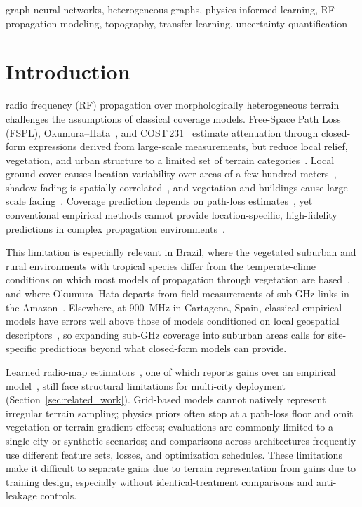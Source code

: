 \documentclass{ieeeaccess}
\begin{document}
\begin{keywords}
graph neural networks, heterogeneous graphs, physics-informed learning, RF propagation modeling, topography, transfer learning, uncertainty quantification
\end{keywords}

\titlepgskip=-15pt

\maketitle

\section{Introduction}
\label{sec:introduction}

 radio frequency (RF) propagation over morphologically heterogeneous terrain challenges the assumptions of classical coverage models. Free-Space Path Loss (FSPL), Okumura--Hata~\cite{hata1980empirical}, and COST\,231~\cite{cost231} estimate attenuation through closed-form expressions derived from large-scale measurements, but reduce local relief, vegetation, and urban structure to a limited set of terrain categories~\cite{vasudevan2024machine}. Local ground cover causes location variability over areas of a few hundred meters~\cite{itu1546}, shadow fading is spatially correlated~\cite{tr38901}, and vegetation and buildings cause large-scale fading~\cite{thrane2020model}. Coverage prediction depends on path-loss estimates~\cite{vasudevan2024machine}, yet conventional empirical methods cannot provide location-specific, high-fidelity predictions in complex propagation environments~\cite{yapar2024overview}.

This limitation is especially relevant in Brazil, where the vegetated suburban and rural environments with tropical species differ from the temperate-clime conditions on which most models of propagation through vegetation are based~\cite{silva2018propagation}, and where Okumura--Hata departs from field measurements of sub-GHz links in the Amazon~\cite{lima2024lora}. Elsewhere, at 900~MHz in Cartagena, Spain, classical empirical models have errors well above those of models conditioned on local geospatial descriptors~\cite{lorentelpez2026machine}, so expanding sub-GHz coverage into suburban areas calls for site-specific predictions beyond what closed-form models can provide.

Learned radio-map estimators~\cite{levie2021radiounet,zhang2023rme,shibli2024data}, one of which reports gains over an empirical model~\cite{zhang2023rme}, still face structural limitations for multi-city deployment (Section~\ref{sec:related_work}). Grid-based models cannot natively represent irregular terrain sampling; physics priors often stop at a path-loss floor and omit vegetation or terrain-gradient effects; evaluations are commonly limited to a single city or synthetic scenarios; and comparisons across architectures frequently use different feature sets, losses, and optimization schedules. These limitations make it difficult to separate gains due to terrain representation from gains due to training design, especially without identical-treatment comparisons and anti-leakage controls.
\end{document}
